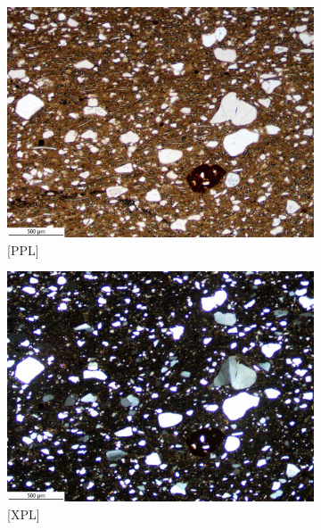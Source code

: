 \documentclass[a4paper]{article}
\begin{document}
\begin{figure}[H]
	\begin{subfigure}[t]{.49\textwidth}
		\includegraphics[width=\textwidth]{ThinSections/49-1_4x_PPL.jpg}
		\caption{[PPL]}
	\end{subfigure}\hspace{.5em}\hfill
	\begin{subfigure}[t]{.49\textwidth}
		\includegraphics[width=\textwidth]{ThinSections/49-1_4x_XPL.jpg}
		\caption{[XPL]}
	\end{subfigure}
	\begin{subfigure}[t]{.49\textwidth}

\end{subfigure}
\end{figure}
\end{document}
